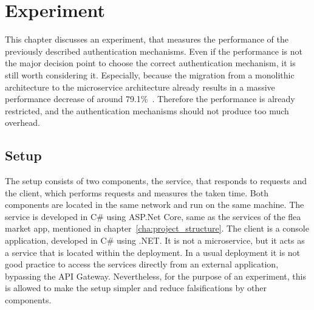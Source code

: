 \chapter{Experiment}
\label{cha:experiment}
This chapter discusses an experiment, that measures the performance of the previously described authentication mechanisms.
Even if the performance is not the major decision point to choose the correct authentication mechanism, it is still worth considering it.
Especially, because the migration from a monolithic architecture to the microservice architecture already results in a massive performance decrease of around 79.1\%~\cite{ueda2016workload}.
Therefore the performance is already restricted, and the authentication mechanisms should not produce too much overhead.

\section{Setup}
The setup consists of two components, the service, that responds to requests and the client, which performs requests and measures the taken time.
Both components are located in the same network and run on the same machine.
The service is developed in C\# using ASP.Net Core, same as the services of the flea market app, mentioned in chapter~\ref{cha:project_structure}.
The client is a console application, developed in C\# using .NET.
It is not a microservice, but it acts as a service that is located within the deployment.
In a usual deployment it is not good practice to access the services directly from an external application, bypassing the API Gateway.
Nevertheless, for the purpose of an experiment, this is allowed to make the setup simpler and reduce falsifications by other components. 


